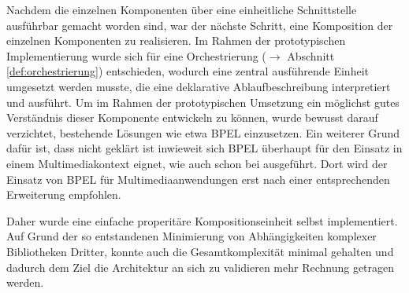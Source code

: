   Nachdem die einzelnen Komponenten über eine einheitliche Schnittstelle ausführbar gemacht worden sind, war der nächste Schritt, eine Komposition der einzelnen Komponenten zu realisieren. Im Rahmen der prototypischen Implementierung wurde sich für eine Orchestrierung ($\to$ Abschnitt \ref{def:orchestrierung}) entschieden, wodurch eine zentral ausführende Einheit umgesetzt werden musste, die eine deklarative Ablaufbeschreibung interpretiert und ausführt. Um im Rahmen der prototypischen Umsetzung ein möglichst gutes Verständnis dieser Komponente entwickeln zu können, wurde bewusst darauf verzichtet, bestehende Lösungen wie etwa BPEL einzusetzen. Ein weiterer Grund dafür ist, dass nicht geklärt ist inwieweit sich BPEL überhaupt für den Einsatz in einem Multimediakontext eignet, wie auch schon bei \citep{samma08} ausgeführt. Dort wird der Einsatz von BPEL für Multimediaanwendungen erst nach einer entsprechenden Erweiterung empfohlen.
  
  Daher wurde eine einfache properitäre Kompositionseinheit selbst implementiert. Auf Grund der so entstandenen Minimierung von Abhängigkeiten komplexer Bibliotheken Dritter, konnte auch die Gesamtkomplexität minimal gehalten und dadurch dem Ziel die Architektur an sich zu validieren mehr Rechnung getragen werden.
  
